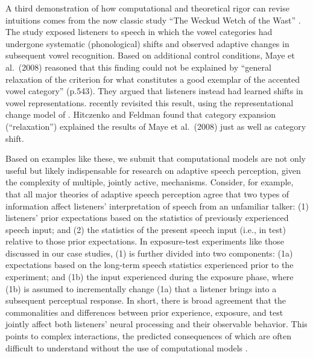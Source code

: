 \documentclass[
  11pt,
  man,floatsintext]{apa6}
\begin{document}
A third demonstration of how computational and theoretical rigor can revise intuitions comes from the now classic study ``The Weckud Wetch of the Wast'' \autocite{maye2008}. The study exposed listeners to speech in which the vowel categories had undergone systematic (phonological) shifts and observed adaptive changes in subsequent vowel recognition. Based on additional control conditions, Maye et al.~(2008) reasoned that this finding could not be explained by ``general relaxation of the criterion for what constitutes a good exemplar of the accented vowel category'' (p.543). They argued that listeners instead had learned shifts in vowel representations. \textcite{hitczenko-feldman2016} recently revisited this result, using the representational change model of \textcite{kleinschmidt-jaeger2015}. Hitczenko and Feldman found that category expansion (``relaxation'') explained the results of Maye et al.~(2008) just as well as category shift.

Based on examples like these, we submit that computational models are not only useful but likely indispensable for research on adaptive speech perception, given the complexity of multiple, jointly active, mechanisms. Consider, for example, that all major theories of adaptive speech perception agree that two types of information affect listeners' interpretation of speech from an unfamiliar talker: (1) listeners' prior expectations based on the statistics of previously experienced speech input; and (2) the statistics of the present speech input (i.e., in test) relative to those prior expectations. In exposure-test experiments like those discussed in our case studies, (1) is further divided into two components: (1a) expectations based on the long-term speech statistics experienced prior to the experiment; and (1b) the input experienced during the exposure phase, where (1b) is assumed to incrementally change (1a) that a listener brings into a subsequent perceptual response. In short, there is broad agreement that the commonalities and differences between prior experience, exposure, and test jointly affect both listeners' neural processing and their observable behavior. This points to complex interactions, the predicted consequences of which are often difficult to understand without the use of computational models \autocites[for further examples and discussion, see][]{apfelbaum-mcmurray2015,sohoglu-davis2016,tan2021,theodore-monto2019,toscano2018,xie2021cognition}.
\end{document}
